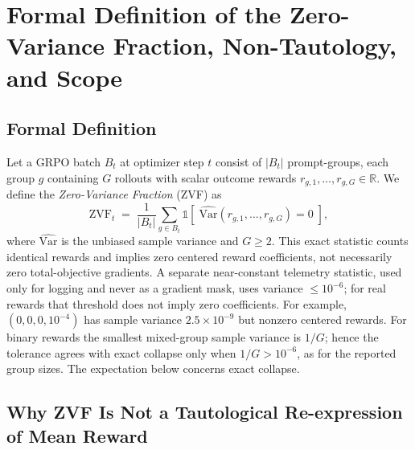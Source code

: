 \section{Formal Definition of the Zero-Variance Fraction, Non-Tautology, and Scope}
\label{sec:appendix:zvf-formalization}

\subsection{Formal Definition}

Let a GRPO batch $B_t$ at optimizer step $t$ consist of $|B_t|$ prompt-groups,
each group $g$ containing $G$ rollouts with scalar outcome rewards
$r_{g,1}, \ldots, r_{g,G} \in \mathbb{R}$. We define the \emph{Zero-Variance
Fraction} (ZVF) as
\begin{equation}
\label{eq:zvf}
\mathrm{ZVF}_t \;=\; \frac{1}{|B_t|} \sum_{g \in B_t}
  \mathbb{1}\!\left[\;\widehat{\mathrm{Var}}(r_{g,1}, \ldots, r_{g,G}) = 0\;\right],
\end{equation}
where $\widehat{\mathrm{Var}}$ is the unbiased sample variance and $G\ge2$.
This exact statistic counts identical rewards and implies zero centered
reward coefficients, not necessarily zero total-objective gradients.
A separate near-constant telemetry statistic, used only for logging and
never as a gradient mask, uses variance $\le10^{-6}$;
for real rewards that threshold does not imply zero coefficients. For example,
$(0,0,0,10^{-4})$ has sample variance $2.5\times10^{-9}$ but nonzero centered
rewards. For binary rewards the smallest mixed-group sample variance is
$1/G$; hence the tolerance agrees with exact collapse only when $1/G>10^{-6}$,
as for the reported group sizes. The expectation below concerns exact collapse.

\subsection{Why ZVF Is Not a Tautological Re-expression of Mean Reward}

